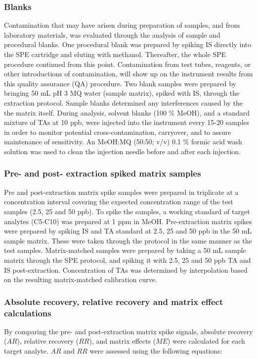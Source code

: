 
\subsubsection{Blanks}
Contamination that may have arisen during preparation of samples, and from laboratory materials, was evaluated through the analysis of sample and procedural blanks. One procedural blank was prepared by spiking IS directly into the SPE cartridge and eluting with methanol. Thereafter, the whole SPE procedure continued from this point. Contamination from test tubes, reagents, or other introductions of contamination, will show up on the instrument results from this quality assurance (QA) procedure. Two blank samples were prepared by bringing 50 mL pH 3 MQ water (sample matrix), spiked with IS, through the extraction protocol. Sample blanks determined any interferences caused by the the matrix itself. During analysis, solvent blanks (100 \% MeOH), and a standard mixture of TAs at 10 ppb, were injected into the instrument every 15-20 samples in order to monitor potential cross-contamination, carryover, and to assure maintenance of sensitivity. An MeOH:MQ (50:50; v/v) 0.1 \% formic acid wash solution was used to clean the injection needle before and after each injection.

\subsubsection{Pre- and post- extraction spiked matrix samples}
Pre and post-extraction matrix spike samples were prepared in triplicate at a concentration interval covering the expected concentration range of the test samples (2.5, 25 and 50 ppb). To spike the samples, a working standard of target analytes (C5-C10) was prepared at 1 ppm in MeOH. Pre-extraction matrix spikes were prepared by spiking IS and \acrshort{TA} standard at 2.5, 25 and 50 ppb in the 50 mL sample matrix. These were taken through the protocol in the same manner as the test samples. Matrix-matched samples were prepared by taking a 50 mL sample matrix through the SPE protocol, and spiking it with 2.5, 25 and 50 ppb TA and IS post-extraction. Concentration of TAs was determined by interpolation based on the resulting matrix-matched calibration curve. 

\subsubsection{Absolute recovery, relative recovery and matrix effect calculations}
By comparing the pre- and post-extraction matrix spike signals, absolute recovery ($AR$), relative recovery ($RR$), and matrix effects ($ME$) were calculated for each target analyte. $AR$ and $RR$ were assessed using the following equations:

